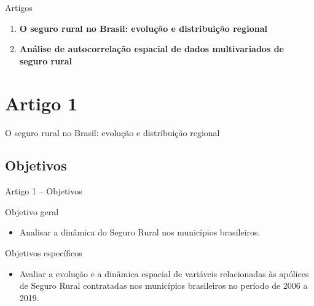\documentclass[aspectratio=169]{beamer}
\begin{document}
\begin{frame}{Artigos}
    \begin{enumerate}
        \item \textbf{O seguro rural no Brasil: evolução e distribuição regional}
        \vspace{0.5cm}
        \item \textbf{Análise de autocorrelação espacial de dados multivariados de seguro rural}
        \vspace{0.5cm}
    \end{enumerate}
\end{frame}

\section{Artigo 1}

\begin{frame}
\begin{alertblock}{}
    \begin{center}
        \vspace{0.4cm}
        \Large O seguro rural no Brasil: evolução e distribuição regional
        \vspace{0.4cm}
    \end{center}
\end{alertblock}
\end{frame}

\subsection{Objetivos}

\begin{frame}{Artigo 1 -- Objetivos} 
	\begin{exampleblock}{Objetivo geral}
	   \begin{itemize}
		    \item Analisar a dinâmica do Seguro Rural nos municípios brasileiros.
	    \end{itemize}
	\end{exampleblock}
	\vspace{0.5cm}
	\begin{exampleblock}{Objetivos específicos}
	   \begin{itemize}
		    \item Avaliar a evolução e a dinâmica espacial de variáveis relacionadas às apólices de Seguro Rural contratadas nos municípios brasileiros no período de 2006 a 2019.
	    \end{itemize}
	\end{exampleblock}
\end{frame}
\end{document}

